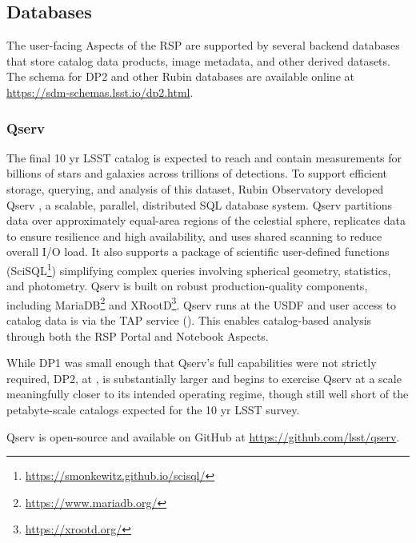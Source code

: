 \subsection{Databases}
\label{ssec:databases}
%
The user-facing Aspects of the \gls{RSP} are supported by several backend databases that store catalog data products, image \gls{metadata}, and other derived datasets.
The \gls{schema} for \gls{DP2} and other Rubin databases are available online at \url{https://sdm-schemas.lsst.io/dp2.html}.

\subsubsection{Qserv}
\label{sssec:qserv}
%
The final 10 yr \gls{LSST} catalog is expected to reach \tenyearcatalogsize and contain measurements for billions of stars and galaxies across trillions of detections.
To support efficient storage, querying, and analysis of this dataset, Rubin Observatory developed Qserv \citep[][]{Wang:2011:QDS:2063348.2063364, 2025ASPC..538..114M},  a scalable, parallel, distributed SQL database system.
\gls{Qserv} partitions data over approximately equal-area regions of the celestial sphere, replicates data to ensure resilience and high availability, and uses shared scanning to reduce overall I/O load.
It also supports a package of scientific user-defined functions (SciSQL\footnote{\url{https://smonkewitz.github.io/scisql/}}) simplifying complex queries involving spherical geometry, statistics, and photometry.
\gls{Qserv} is built on robust production-quality components, including MariaDB\footnote{\url{https://www.mariadb.org/}} and XRootD\footnote{\url{https://xrootd.org/}}.
\gls{Qserv} runs at the \gls{USDF} and user access to catalog data is via the \gls{TAP} service ().
This enables catalog-based analysis through both the \gls{RSP} Portal and Notebook Aspects.

While \gls{DP1} was small enough that Qserv's full capabilities were not strictly required, \gls{DP2}, at \edptwosize, is substantially larger and begins to exercise Qserv at a scale meaningfully closer to its intended operating regime, though still well short of the petabyte-scale catalogs expected for the 10 yr LSST survey.

\gls{Qserv} is open-source and available on GitHub at \url{https://github.com/lsst/qserv}.

